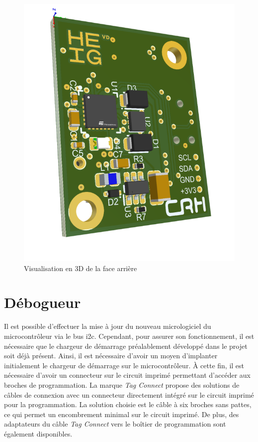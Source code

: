\begin{figure}[H]
    \centering
    \includegraphics[scale=0.25]{./assets/figures/pcb_verso.png}
    \caption{Visualisation en 3D de la face arrière}
\end{figure}

\section{Débogueur}

Il est possible d'effectuer la mise à jour du nouveau micrologiciel du microcontrôleur via le bus \gls{i2c}.
Cependant, pour assurer son fonctionnement, il est nécessaire que le chargeur de démarrage préalablement développé dans le projet soit déjà présent.
Ainsi, il est nécessaire d'avoir un moyen d'implanter initialement le chargeur de démarrage sur le microcontrôleur.
À cette fin, il est nécessaire d'avoir un connecteur sur le circuit imprimé permettant d'accéder aux broches de programmation.
La marque \textit{Tag Connect} propose des solutions de câbles de connexion avec un connecteur directement intégré sur le circuit imprimé pour la programmation.
La solution choisie est le câble à six broches sans pattes, ce qui permet un encombrement minimal sur le circuit imprimé.
De plus, des adaptateurs du câble \textit{Tag Connect} vers le boîtier de programmation sont également disponibles.

